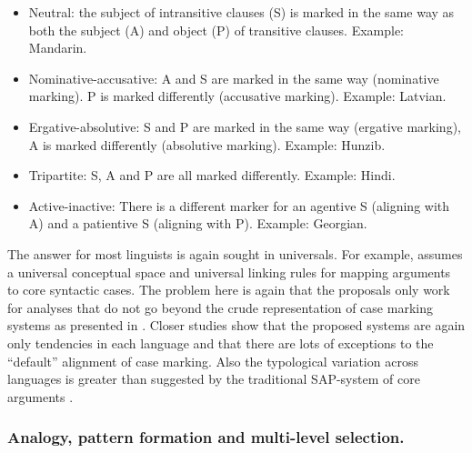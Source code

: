 \begin{itemize}
\item Neutral: the subject of intransitive clauses (S) is marked in the same way as both the subject (A) and object (P) of transitive clauses. Example: Mandarin.
\item Nominative-accusative: A and S are marked in the same way (nominative marking). P is marked differently (accusative marking). Example: Latvian.
\item Ergative-absolutive: S and P are marked in the same way (ergative marking), A is marked differently (absolutive marking). Example: Hunzib.
\item Tripartite: S, A and P are all marked differently. Example: Hindi.
\item Active-inactive: There is a different marker for an agentive S (aligning with A) and a patientive S (aligning with P). Example: Georgian. 
\end{itemize}

The answer for most linguists is again sought in universals. For example, \citet{croft98event} assumes a universal conceptual space and universal linking rules for mapping arguments to core syntactic cases. The problem here is again that the proposals only work for analyses that do not go beyond the crude representation of case marking systems as presented in . Closer studies show that the proposed systems are again only tendencies in each language and that there are lots of exceptions to the ``default'' alignment of case marking. Also the typological variation across languages is greater than suggested by the traditional SAP-system of core arguments \citep{mithun05beyond}.


\subsubsection{Analogy, pattern formation and multi-level selection.}

